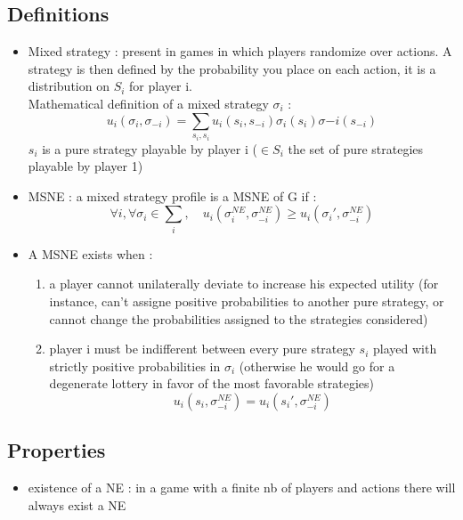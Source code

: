 \documentclass{article}
\begin{document}
\subsection{Definitions}
\begin{itemize}
    \item Mixed strategy : present in games in which players randomize over actions. A strategy is then defined by the probability you place on each action, it is a distribution on $S_i$ for player i.\\
    Mathematical definition of a mixed strategy $\sigma_i$ :
    \begin{equation}
        u_i(\sigma_i,\sigma_{-i}) = \sum_{s_i, s_i} u_i(s_i, s_{-i})\sigma_i(s_i)\sigma{-i}(s_{-i})
    \end{equation}
$s_i$ is a pure strategy playable by player i ($\in S_i$ the set of pure strategies playable by player 1)
    \item MSNE : a mixed strategy profile is a MSNE of G if :
    \begin{equation}
\forall i, \forall \sigma_i\in\sum_i ,\hspace{1em} u_i(\sigma_i^{NE},\sigma_{-i}^{NE}) \geq u_i(\sigma_i',\sigma_{-i}^{NE})
    \end{equation}
    \item A MSNE exists when : 
        \begin{enumerate}
            \item a player cannot unilaterally deviate to increase his expected utility (for instance, can't assigne positive probabilities to another pure strategy, or cannot change the probabilities assigned to the strategies considered)
            \item player i must be indifferent between every pure strategy $s_i$ played with strictly positive probabilities in $\sigma_i$ (otherwise he would go for a degenerate lottery in favor of the most favorable strategies)
            \begin{equation}
                u_i(s_i,\sigma_{-i}^{NE}) = u_i(s_i',\sigma_{-i}^{NE})
            \end{equation}
        \end{enumerate}
\end{itemize}

\subsection{Properties}
\begin{itemize}
    \item existence of a NE : in a game with a finite nb of players and actions there will always exist a NE
\end{itemize}
\end{document}

